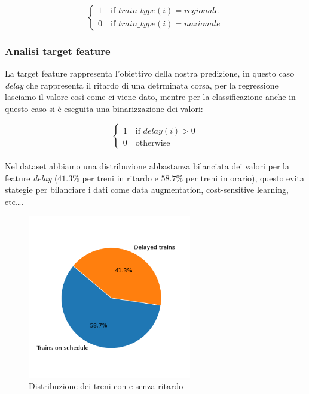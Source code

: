 \documentclass[italian,12pt,a4paper]{article}
\begin{document}
				\begin{equation*}
					\begin{cases}
						1 \quad \text{if } train\_type(i) = regionale \\
						0 \quad \text{if } train\_type(i) = nazionale
					\end{cases}
				\end{equation*}
				
			\subsubsection{Analisi target feature}
				La target feature rappresenta l'obiettivo della nostra predizione, in questo caso \textit{delay} che rappresenta il ritardo di una detrminata corsa, per la regressione lasciamo il valore così come ci viene dato, mentre per la classificazione anche in questo caso si è eseguita una binarizzazione dei valori:
				
				\begin{equation*}
					\begin{cases}
						1 \quad \text{if } delay(i) > 0  \\
						0 \quad \text{otherwise}
					\end{cases}
				\end{equation*}
				\linebreak
				\\
				Nel dataset abbiamo una distribuzione abbastanza bilanciata dei valori per la feature \textit{delay} ($41.3\%$ per treni in ritardo e $58.7\%$ per treni in orario), questo evita stategie per bilanciare i dati come data augmentation, cost-sensitive learning, etc\dots.
				
				\begin{figure}[!h]
					\centering
					\includegraphics[width=270px]{img/delay_graph}
					\caption{Distribuzione dei treni con e senza ritardo}
				\end{figure}
			
\end{document}
